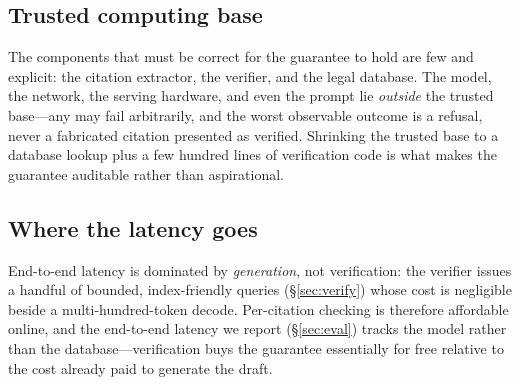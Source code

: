 \subsection{Trusted computing base}
The components that must be correct for the guarantee to hold are few and
explicit: the citation extractor, the verifier, and the legal database. The
model, the network, the serving hardware, and even the prompt lie
\emph{outside} the trusted base---any may fail arbitrarily, and the worst
observable outcome is a refusal, never a fabricated citation presented as
verified. Shrinking the trusted base to a database lookup plus a few hundred
lines of verification code is what makes the guarantee auditable rather than
aspirational.

\subsection{Where the latency goes}
End-to-end latency is dominated by \emph{generation}, not verification: the
verifier issues a handful of bounded, index-friendly queries
(\S\ref{sec:verify}) whose cost is negligible beside a multi-hundred-token
decode. Per-citation checking is therefore affordable online, and the
end-to-end latency we report (\S\ref{sec:eval}) tracks the model rather than
the database---verification buys the guarantee essentially for free relative to
the cost already paid to generate the draft.
